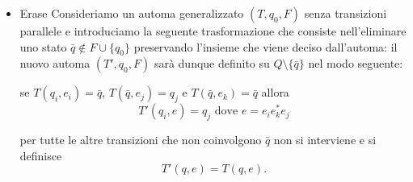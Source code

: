 \begin{itemize}
\begin{figure}[H]
\caption{Fusione di due transizioni parallele da $q_i$ a $q_j$ in un'unica transizione etichettata dalla somma delle espressioni regolari.}
\label{fig:merge}
\end{figure}
\begin{figure}[H]
\centering
{}
\caption{Caso particolare del Merge con $q_i = q_j = q$: due cappi su $q$ sono transizioni parallele da $q$ a $q$, e vengono fusi in un unico cappio etichettato da $e_1 + e_2$.}
\label{fig:merge-loop}
\end{figure}

    \item Erase Consideriamo un automa generalizzato $(T, q_0, F)$ senza transizioni parallele e introduciamo la seguente trasformazione che consiste nell'eliminare uno stato $\bar{q} \notin F \cup \{q_0\}$ preservando l'insieme che viene deciso dall'automa: il nuovo automa $(T', q_0, F)$ sarà dunque definito su $Q \setminus \{\bar{q}\}$ nel modo seguente: 
    
    se $T(q_i, e_i) = \bar{q}$, $T(\bar{q}, e_j) = q_j$ e $T(\bar{q}, e_k) = \bar{q}$ allora
    \[
    T'(q_i, e) = q_j \text{ dove } e = e_i e_k^* e_j
    \]
    
    per tutte le altre transizioni che non coinvolgono $\bar{q}$ non si interviene e si definisce
    \[
    T'(q, e) = T(q, e).
    \]
\begin{figure}[H]
\centering
{}
\end{figure}
\end{itemize}
